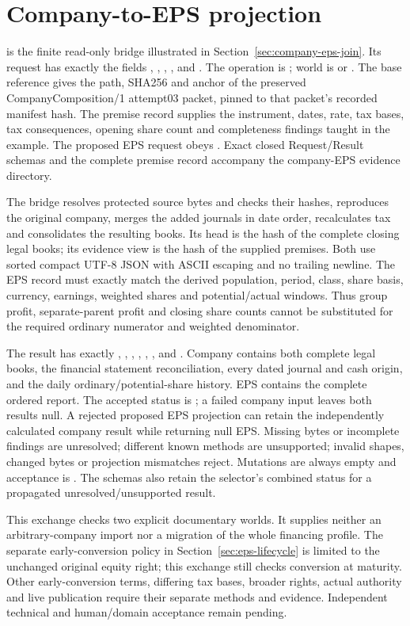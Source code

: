 \section{Company-to-EPS projection}
\label{sec:company-eps-records}

 is the finite read-only bridge illustrated in
Section~\ref{sec:company-eps-join}. Its request has exactly the fields
, , , ,
 and . The operation is ; world is
 or . The base reference gives the path,
SHA256 and anchor of the preserved CompanyComposition/1 attempt03 packet,
pinned to that packet's recorded manifest hash. The premise record supplies
the instrument, dates, rate, tax bases, tax consequences, opening share count
and completeness findings taught in the example. The proposed EPS request
obeys . Exact closed Request/Result schemas and the complete
premise record accompany the company-EPS evidence directory.

The bridge resolves protected source bytes and checks their hashes, reproduces
the original company, merges the added journals in date order, recalculates
tax and consolidates the resulting books. Its head is the hash of the complete
closing legal books; its evidence view is the hash of the supplied premises.
Both use sorted compact UTF-8 JSON with ASCII escaping and no trailing newline.
The EPS record must exactly match the derived population, period, class,
share basis, currency, earnings, weighted shares and potential/actual windows.
Thus group profit, separate-parent profit and closing share counts cannot be
substituted for the required ordinary numerator and weighted denominator.

The result has exactly , , ,
, , ,  and
. Company contains both complete legal books, the financial
statement reconciliation, every dated journal and cash origin, and the daily
ordinary/potential-share history. EPS contains the complete ordered report.
The accepted status is ; a failed company input
leaves both results null. A rejected proposed EPS projection can retain the
independently calculated company result while returning null EPS. Missing
bytes or incomplete findings are unresolved; different known methods are
unsupported; invalid shapes, changed bytes or projection mismatches reject.
Mutations are always empty and acceptance is
. The schemas also retain the selector's
combined  status for a propagated unresolved/unsupported result.

This exchange checks two explicit documentary worlds. It supplies neither
an arbitrary-company import nor a migration of the whole financing profile.
The separate early-conversion policy in Section~\ref{sec:eps-lifecycle} is
limited to the unchanged original equity right; this exchange still checks
conversion at maturity. Other early-conversion terms, differing tax bases,
broader rights, actual authority and live publication require their separate
methods and evidence. Independent technical and human/domain acceptance
remain pending.
